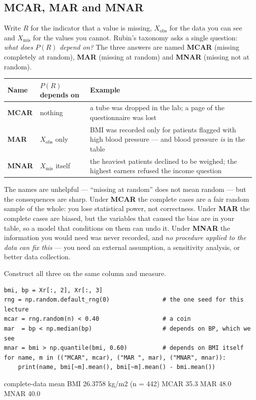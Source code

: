 \documentclass[11pt]{article}
\begin{document}
\subsection{MCAR, MAR and MNAR}
\label{sec:mechanisms}

Write $R$ for the indicator that a value is missing, $X_{\text{obs}}$ for the
data you can see and $X_{\text{mis}}$ for the values you cannot. Rubin's
taxonomy asks a single question: \emph{what does $P(R)$ depend on?} The three
answers are named \textbf{MCAR} (missing completely at random), \textbf{MAR}
(missing at random) and \textbf{MNAR} (missing not at random).

\begin{center}
\begin{tabular}{@{}llp{6.4cm}@{}}
\toprule
\textbf{Name} & \textbf{$P(R)$ depends on} & \textbf{Example}\\
\midrule
\textbf{MCAR} & nothing & a tube was dropped in the lab; a page of the
  questionnaire was lost\\[3pt]
\textbf{MAR}  & $X_{\text{obs}}$ only & BMI was recorded only for patients
  flagged with high blood pressure --- and blood pressure \emph{is} in the
  table\\[3pt]
\textbf{MNAR} & $X_{\text{mis}}$ itself & the heaviest patients declined to be
  weighed; the highest earners refused the income question\\
\bottomrule
\end{tabular}
\end{center}

The names are unhelpful --- ``missing at random'' does not mean random --- but
the consequences are sharp. Under \textbf{MCAR} the complete cases are a fair random sample of the whole:
you lose statistical power, not correctness. Under \textbf{MAR} the complete
cases are biased, but the variables that caused the bias are in your table, so
a model that conditions on them can undo it. Under \textbf{MNAR} the
information you would need was never recorded, and \emph{no procedure applied
to the data can fix this} --- you need an external assumption, a sensitivity
analysis, or better data collection.

Construct all three on the same column and measure.

\begin{lstlisting}
bmi, bp = Xr[:, 2], Xr[:, 3]
rng = np.random.default_rng(0)               # the one seed for this lecture
mcar = rng.random(n) < 0.40                  # a coin
mar  = bp < np.median(bp)                    # depends on BP, which we see
mnar = bmi > np.quantile(bmi, 0.60)          # depends on BMI itself
for name, m in (("MCAR", mcar), ("MAR ", mar), ("MNAR", mnar)):
    print(name, bmi[~m].mean(), bmi[~m].mean() - bmi.mean())
\end{lstlisting}
\begin{codeout}
complete-data mean BMI  26.3758 kg/m2   (n = 442)
  MCAR  35.3%
  MAR   48.0%
  MNAR  40.0%
\end{codeout}
\end{document}
